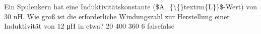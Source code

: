     {Ein Spulenkern hat eine Induktivitätskonstante (\$A\_\{\textbackslash\{\}textrm\{L\}\}\$-Wert) von 30 nH. Wie groß ist die erforderliche Windungszahl zur Herstellung einer Induktivität von 12 μH in etwa?}
    {20}
    {400}
    {360}
    {6}
    {false}{false}
